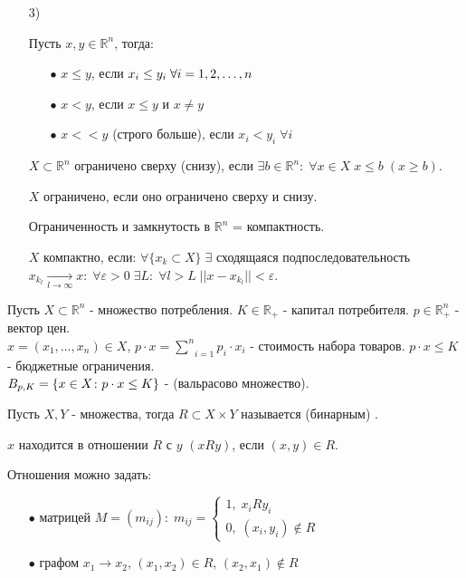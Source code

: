 \begin{itemize}
	\item[$3$)]

		Пусть $x, y \in \mathbb{R}^n$, тогда:
		\begin{itemize}
			\item[$\bullet$]
				$x \le y$, если $x_i \le y_i \; \forall i = 1,2,\dots,n$
			\item[$\bullet$]
				$x < y$, если $x \le y$ и $x \not= y$
			\item[$\bullet$]
				$x << y$ (строго больше), если $x_i < y_i \; \forall i$
		\end{itemize}

		$X \subset \mathbb{R}^n$ ограничено сверху (снизу), если $\exists b \in\mathbb{R}^n: \; \forall x \in X \; x \le b \; (x \ge b)$.

		$X$ ограничено, если оно ограничено сверху и снизу.

		Ограниченность и замкнутость в $\mathbb{R}^n$ = компактность.

		$X$ компактно, если: $\forall \{x_k \subset X\} \; \exists$ сходящаяся подпоследовательность \\
		$x_{k_l} \underset{l \longrightarrow \infty}{\to} x: \; \forall \varepsilon > 0 \; \exists L: \; \forall l > L \; ||x - x_{k_l}|| < \varepsilon$. 
\end{itemize}

Пусть $X \subset \mathbb{R}^n$ - множество потребления. $K \in \mathbb{R}_{+}$ - капитал потребителя. $p \in \mathbb{R}_{+}^n$ - вектор цен. \\

$x = (x_1, \dots, x_n) \in X$, $p \cdot x = \underset{i=1}{\overset{n}{\sum}}p_i \cdot x_i$ - стоимость набора товаров. $p \cdot x \le K$ - бюджетные ограничения.\\

$B_{p, K} = \left\{x \in X\colon p\cdot x \le K\right\}$ -  (вальрасово множество).

\begin{definition}\label{cha:1/def:3}
	Пусть $X,Y$ - множества, тогда $R \subset X \times Y$ называется (бинарным) .

	$x$ находится в отношении $R$ с $y$ $(xRy)$, если $(x,y) \in R$.
\end{definition}

Отношения можно задать:
\begin{itemize}
	\item[$\bullet$] 
		матрицей $M=(m_{ij}): \; m_{ij} = \begin{cases}
			1, \; x_i R y_i \\
			0, \; (x_i, y_i) \not \in R
		\end{cases}$
	\item[$\bullet$]
		графом $x_1 \to x_2$, $(x_1, x_2) \in R$, $(x_2, x_1) \not \in R$
\end{itemize}


